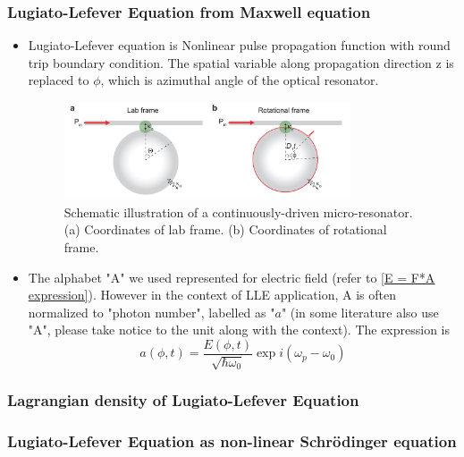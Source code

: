 \documentclass[12pt]{extarticle}
\numberwithin{equation}{section}
\numberwithin{figure}{section}
\numberwithin{table}{section}
\newcommand{\<}{\langle}
\renewcommand{\>}{\rangle}
\theoremstyle{definition}
\begin{document}
    \subsubsection{Lugiato-Lefever Equation from Maxwell equation}
        \begin{itemize}
            \item Lugiato-Lefever equation is Nonlinear pulse propagation function with round trip boundary condition. The spatial variable along propagation direction z is replaced to $\phi$, which is  azimuthal angle of the optical resonator.
            \begin{figure}[htbp]
                \centering
                \includegraphics[width=0.8\textwidth]{images/optical_resonator.jpg}
                \caption{Schematic illustration of a continuously-driven micro-resonator. (a) Coordinates of lab frame. (b) Coordinates of rotational frame.\cite{yang_nonlinear_2019}}
                \label{optical resonator fig}
            \end{figure}
            \item The alphabet "A" we used represented for electric field (refer to \autoref{E = F*A expression}). However in the context of LLE application, A is often normalized to "photon number", labelled as "$a$" (in some literature\cite{yang_nonlinear_2019} also use "A", please take notice to the unit along with the context). The expression is
            \begin{equation}
                a(\phi,t) = \frac{E(\phi,t)}{\sqrt{\hbar \omega_0}}\exp{i(\omega_p-\omega_0)}
            \end{equation}
            
        \end{itemize}
        
        \subsubsection{Lagrangian density of Lugiato-Lefever Equation}
        
        \subsubsection{Lugiato-Lefever Equation as non-linear Schrödinger equation}
\end{document}
